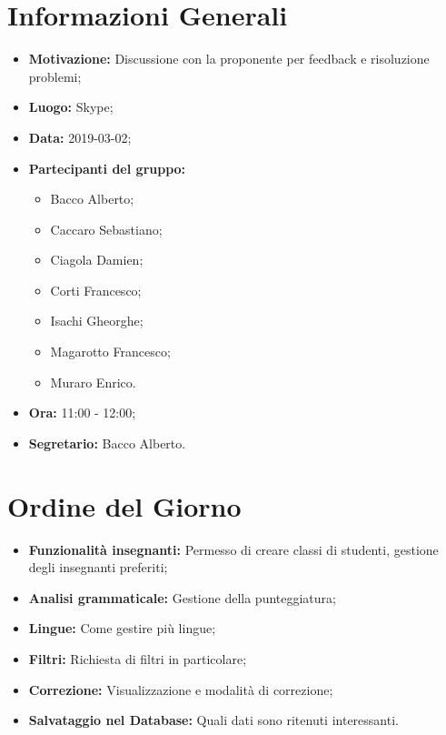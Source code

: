 \documentclass[a4paper, oneside, openany, dvipsnames, table]{article}
\begin{document}
\copertina{}


\newpage
\tableofcontents
\newpage
\section{Informazioni Generali}
\begin{itemize}
\item \textbf{Motivazione:} Discussione con la proponente per feedback e risoluzione problemi;
\item \textbf{Luogo:} Skype;
\item \textbf{Data:} 2019-03-02;
\item \textbf{Partecipanti del gruppo:} \hfill
	\begin{itemize}
	\item Bacco Alberto;
	\item Caccaro Sebastiano;
	\item Ciagola Damien;
	\item Corti Francesco;
	\item Isachi Gheorghe;
	\item Magarotto Francesco;
	\item Muraro Enrico.
	\end{itemize} 
\item \textbf{Ora:} 11:00 - 12:00;
\item \textbf{Segretario:} Bacco Alberto.
\end{itemize}

\section{Ordine del Giorno}
\begin{itemize}
	\item \textbf{Funzionalità insegnanti:} Permesso di creare classi di studenti, gestione degli insegnanti preferiti;
	\item \textbf{Analisi grammaticale:} Gestione della punteggiatura;
	\item \textbf{Lingue:} Come gestire più lingue;
	\item \textbf{Filtri:} Richiesta di filtri in particolare;
	\item \textbf{Correzione:} Visualizzazione e modalità di correzione;
	\item \textbf{Salvataggio nel Database:} Quali dati sono ritenuti interessanti.
\end{itemize}
\end{document}
